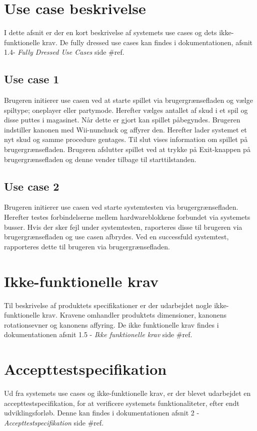 \newpage
\section{Use case beskrivelse}
I dette afsnit er der en kort beskrivelse af systemets use cases og dets ikke-funktionelle krav. De fully dressed use cases kan findes i dokumentationen, afsnit 1.4- \textit{Fully Dressed Use Cases} side \#ref.

\subsection{Use case 1}
Brugeren initierer use casen ved at starte spillet via brugergrænsefladen og vælge spiltype; oneplayer eller partymode. Herefter vælges antallet af skud i et spil og disse puttes i magasinet. Når dette er gjort kan spillet påbegyndes. Brugeren indstiller kanonen med Wii-nunchuck og affyrer den. Herefter lader systemet et nyt skud og samme procedure gentages. Til slut vises information om spillet på brugergrænsefladen. Brugeren afslutter spillet ved at trykke på Exit-knappen på brugergrænsefladen og denne vender tilbage til starttilstanden. 

\subsection{Use case 2}
\label{afsnit:usecasebeskrivelseUC2}
Brugeren initierer use casen ved starte systemtesten via brugergrænsefladen. Herefter testes forbindelserne mellem hardwareblokkene forbundet via systemets busser. Hvis der sker fejl under systemtesten, raporteres disse til brugeren via brugergrænsefladen og use casen afbrydes. Ved en successfuld systemtest, rapporteres dette til brugeren via brugergrænsefladen.

\section{Ikke-funktionelle krav}
Til beskrivelse af produktets specifikationer er der udarbejdet nogle ikke-funktionelle krav. Kravene omhandler produktets dimensioner, kanonens rotationsevner og kanonens affyring. De ikke funktionelle krav findes i dokumentationen afsnit 1.5 - \textit{Ikke funktionelle krav} side \#ref.

\section{Accepttestspecifikation}
Ud fra systemets use cases og ikke-funktionelle krav, er der blevet udarbejdet en accepttestspecifikation, for at verificere systemets funktionaliteter, efter endt udviklingsforløb. Denne kan findes i dokumentationen afsnit 2 - \textit{Accepttestspecifikation} side \#ref. 